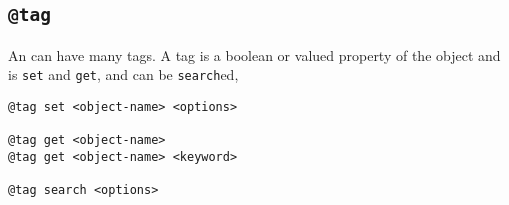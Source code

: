 \subsection{\texttt{@tag}}
\label{tag}

An  can have many tags. A tag is a boolean or valued property of the object and is \texttt{set} and \texttt{get}, and can be \texttt{search}ed,
%
\begin{verbatim}
@tag set <object-name> <options>

@tag get <object-name>
@tag get <object-name> <keyword>

@tag search <options>
\end{verbatim}
